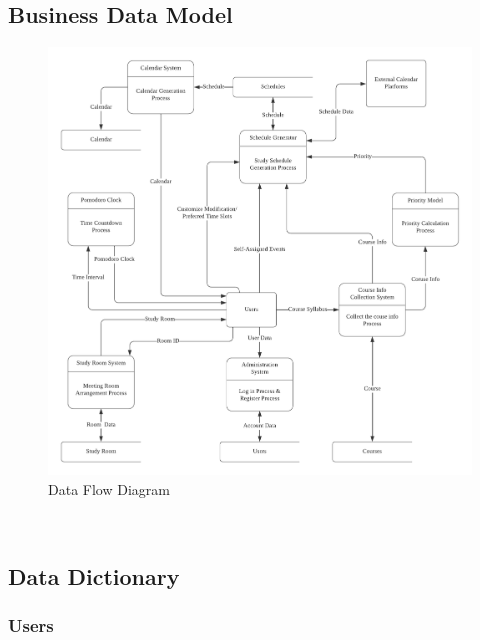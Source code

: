 \documentclass[12pt]{article}
\begin{document}
\subsection{Business Data Model}
\begin{figure}[h]
  \centering
  \includegraphics[width=1\linewidth]{DFD.png}
  \caption{Data Flow Diagram} 
  \label{fig:dfd} 
\end{figure}
\\

\subsection{Data Dictionary}
\subsubsection{Users}
\end{document}
